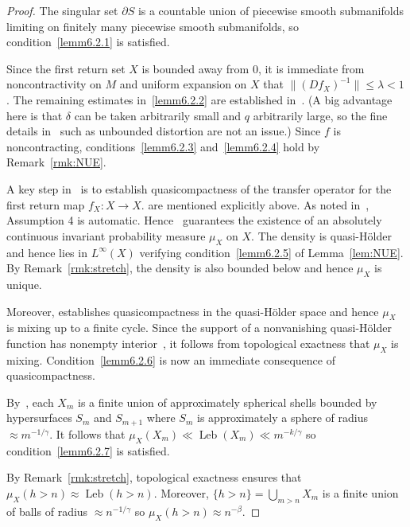 \documentclass[AHL,Unicode,longabstracts,published]{cedram}
\DeclareMathOperator{\Leb}{Leb}
\newcommand*{\MK}{\mkern 2mu}
\begin{document}
\begin{proof}
The singular set $\partial S$ is a countable union of piecewise smooth submanifolds limiting on finitely many piecewise smooth submanifolds, so condition~\eqref{lemm6.2.1} is satisfied.

Since the first return set $X$ is bounded away from $0$, it is immediate from noncontractivity on $M$ and uniform expansion on $X$ that $\|(Df_X)^{-1}\|\le\lambda<1$. The remaining estimates in~\eqref{lemm6.2.2} are established in~\cite{HuVaienti09,HuVaientiapp}. (A big advantage here is that $\delta$ can be taken arbitrarily small and $q$ arbitrarily large, so the fine details in~\cite{HuVaienti09,HuVaientiapp} such as unbounded distortion are not an issue.) Since $f$ is noncontracting, conditions~\eqref{lemm6.2.3} and~\eqref{lemm6.2.4} hold by Remark~\ref{rmk:NUE}.

A key step in~\cite{HuVaienti09} is to establish quasicompactness of the transfer operator for the first return map $f_X:X\to X$. \cite[Theorem~A$\MK$(Assumptions~1--3)]{HuVaienti09} are mentioned explicitly above. As noted in~\cite[Example~5.1]{HuVaientiapp}, Assumption 4 is automatic. Hence~\cite[Theorem~A]{HuVaienti09} guarantees the existence of an absolutely continuous invariant probability measure $\mu_X$ on $X$. The density is quasi-H\"older and hence lies in $L^\infty(X)$ verifying condition~\eqref{lemm6.2.5} of Lemma~\ref{lem:NUE}. By Remark~\ref{rmk:stretch}, the density is also bounded below and hence $\mu_X$ is unique.

Moreover, \cite[Theorem~A]{HuVaienti09} establishes quasicompactness in the quasi-H\"older space and hence $\mu_X$ is mixing up to a finite cycle. Since the support of a nonvanishing quasi-H\"older function has nonempty interior~\cite[Lemma~3.1]{Saussol00}, it follows from topological exactness that $\mu_X$ is mixing. Condition~\eqref{lemm6.2.6} is now an immediate consequence of quasicompactness.

By~\cite{HuVaienti09}, each $X_m$ is a finite union of approximately spherical shells bounded by hypersurfaces $S_m$ and $S_{m+1}$ where $S_m$ is approximately a sphere of radius $\approx m^{-1/\gamma}$. It follows that $\mu_X(X_m)\ll\Leb(X_m)\ll m^{-k/\gamma}$ so condition~\eqref{lemm6.2.7} is satisfied.

By Remark~\ref{rmk:stretch}, topological exactness ensures that $\mu_X(h>n)\approx\Leb(h>n)$. Moreover, $\{h>n\}=\bigcup_{m>n}X_m$ is a finite union of balls of radius $\approx n^{-1/\gamma}$ so $\mu_X(h>n)\approx n^{-\beta}$.
\end{proof}
\end{document}
